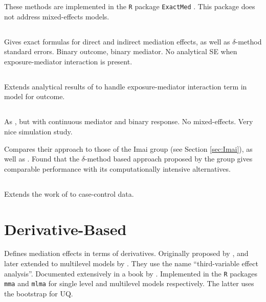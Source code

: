 \documentclass{article}
\begin{document}
These methods are implemented in the \texttt{R} package \texttt{ExactMed} \citep{Cau23}. This package does not address mixed-effects models.


\subsection{\citet{Sam18}}

Gives exact formulas for direct and indirect mediation effects, as well as $\delta$-method standard errors. Binary outcome, binary mediator. No analytical SE when exposure-mediator interaction is present.

\subsection{\citet{Sam21}}

Extends analytical results of \citet{Sam18} to handle exposure-mediator interaction term in model for outcome.

\subsection{\citet{Sam23}}

As \citet{Sam18}, but with continuous mediator and binary response. No mixed-effects. Very nice simulation study.

Compares their approach to those of the Imai group (see Section \ref{sec:Imai}), as well as \citet{Lan12}. Found that the $\delta$-method based approach proposed by the \citeauthor{Sam23} group gives comparable performance with its computationally intensive alternatives.

\subsection{\citet{Cau24}}

Extends the work of \citet{Sam23} to case-control data.


\section{Derivative-Based}
\label{sec:deriv}

Defines mediation effects in terms of derivatives. Originally proposed by \citet{Yu14}, and later extended to multilevel models by \citet{Yu20}. They use the name ``third-variable effect analysis''. Documented extensively in a book by \citet{Yu22}. Implemented in the \texttt{R} packages \texttt{mma} and \texttt{mlma} for single level and multilevel models respectively. The latter uses the bootstrap for UQ.
\end{document}
